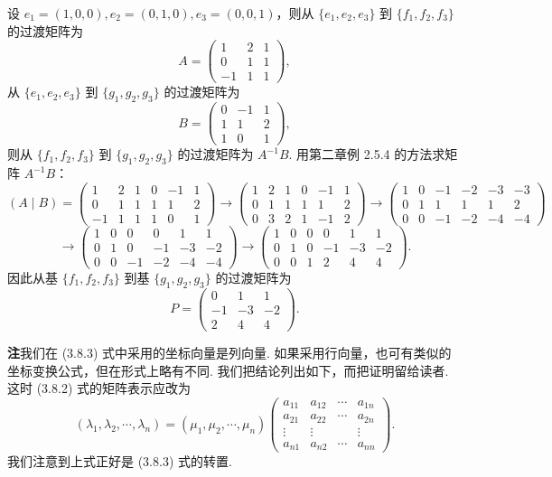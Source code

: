 \documentclass[UTF8, 12pt, fontset=fandol, oneside]{ctexart}
\begin{document}
设 $e_1=(1,0,0),e_2=(0,1,0),e_3=(0,0,1)$，则从 $\{e_1,e_2,e_3\}$ 到 $\{f_1,f_2,f_3\}$ 的过渡矩阵为
\[
A=\left(\begin{array}{rrr}
1&2&1\\
0&1&1\\
-1&1&1
\end{array}\right),
\]
从 $\{e_1,e_2,e_3\}$ 到 $\{g_1,g_2,g_3\}$ 的过渡矩阵为
\[
B=\left(\begin{array}{rrr}
0&-1&1\\
1&1&2\\
1&0&1
\end{array}\right),
\]
则从 $\{f_1,f_2,f_3\}$ 到 $\{g_1,g_2,g_3\}$ 的过渡矩阵为 $A^{-1}B$. 用第二章例 2.5.4 的方法求矩阵 $A^{-1}B$：
\[
(A\mid B)=
\left(\begin{array}{rrr|rrr}
1&2&1&0&-1&1\\
0&1&1&1&1&2\\
-1&1&1&1&0&1
\end{array}\right)
\to
\left(\begin{array}{rrr|rrr}
1&2&1&0&-1&1\\
0&1&1&1&1&2\\
0&3&2&1&-1&2
\end{array}\right)
\to
\left(\begin{array}{rrr|rrr}
1&0&-1&-2&-3&-3\\
0&1&1&1&1&2\\
0&0&-1&-2&-4&-4
\end{array}\right)
\]
\[
\to
\left(\begin{array}{rrr|rrr}
1&0&0&0&1&1\\
0&1&0&-1&-3&-2\\
0&0&-1&-2&-4&-4
\end{array}\right)
\to
\left(\begin{array}{rrr|rrr}
1&0&0&0&1&1\\
0&1&0&-1&-3&-2\\
0&0&1&2&4&4
\end{array}\right).
\]
因此从基 $\{f_1,f_2,f_3\}$ 到基 $\{g_1,g_2,g_3\}$ 的过渡矩阵为
\[
P=\left(\begin{array}{rrr}
0&1&1\\
-1&-3&-2\\
2&4&4
\end{array}\right).
\]

\noindent\textbf{注}\quad 我们在 (3.8.3) 式中采用的坐标向量是列向量. 如果采用行向量，也可有类似的坐标变换公式，但在形式上略有不同. 我们把结论列出如下，而把证明留给读者. 这时 (3.8.2) 式的矩阵表示应改为
\[
(\lambda_1,\lambda_2,\cdots,\lambda_n)=(\mu_1,\mu_2,\cdots,\mu_n)
\left(\begin{array}{cccc}
a_{11}&a_{12}&\cdots&a_{1n}\\
a_{21}&a_{22}&\cdots&a_{2n}\\
\vdots&\vdots&&\vdots\\
a_{n1}&a_{n2}&\cdots&a_{nn}
\end{array}\right).
\]
我们注意到上式正好是 (3.8.3) 式的转置.
\end{document}
